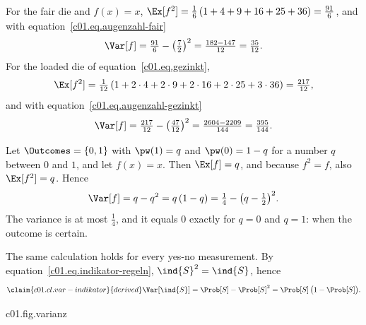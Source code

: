 \begin{example}\label{c01.ex.wuerfel-varianz}
  For the fair die and $f(x) = x$,
  $\Ex[f^2] = \tfrac16\,(1 + 4 + 9 + 16 + 25 + 36) = \tfrac{91}{6}$, and with
  equation~\eqref{c01.eq.augenzahl-fair}
  \begin{equation}\label{c01.eq.varianz-fair}
    \Var[f] = \tfrac{91}{6} - \bigl(\tfrac72\bigr)^2 = \tfrac{182 - 147}{12} = \tfrac{35}{12} .
  \end{equation}
  For the loaded die of equation~\eqref{c01.eq.gezinkt},
  \begin{equation*}
    \Ex[f^2] = \tfrac{1}{12}\,(1 + 2\cdot 4 + 2\cdot 9 + 2\cdot 16 + 2\cdot 25 + 3\cdot 36)
    = \tfrac{217}{12} ,
  \end{equation*}
  and with equation~\eqref{c01.eq.augenzahl-gezinkt}
  \begin{equation}\label{c01.eq.varianz-gezinkt}
    \Var[f] = \tfrac{217}{12} - \bigl(\tfrac{47}{12}\bigr)^2
            = \tfrac{2604 - 2209}{144} = \tfrac{395}{144} .
  \end{equation}
\end{example}

\begin{example}\label{c01.ex.muenze}
  Let $\Outcomes = \{0, 1\}$ with $\pw(1) = q$ and $\pw(0) = 1 - q$ for a number $q$
  between $0$ and $1$, and let $f(x) = x$. Then $\Ex[f] = q$, and because $f^2 = f$,
  also $\Ex[f^2] = q$. Hence
  \begin{equation}\label{c01.eq.zwei-ergebnisse}
    \Var[f] = q - q^2 = q\,(1 - q) = \tfrac14 - \bigl(q - \tfrac12\bigr)^2 .
  \end{equation}
  The variance is at most $\tfrac14$, and it equals $0$ exactly for $q = 0$ and $q = 1$:
  when the outcome is certain.
\end{example}

The same calculation holds for every yes-no measurement. By
equation~\eqref{c01.eq.indikator-regeln}, $\ind{S}^2 = \ind{S}$, hence
\begin{equation}\label{c01.eq.var-indikator}\claim{c01.cl.var-indikator}{derived}
  \Var[\ind{S}] = \Prob[S] - \Prob[S]^2 = \Prob[S]\,\bigl(1 - \Prob[S]\bigr) .
\end{equation}

\begin{tpcfigure}{c01.fig.varianz}

  \caption{(a), (b) Two weights with the same expectation value $\tfrac72$ of the number of
    spots $f(x) = x$ (dashed line) and different variance: the fair die of
    equation~\eqref{c01.eq.varianz-fair} and a weight that lies half on $3$ and half on
    $4$; for the latter $\Ex[f^2] = \tfrac{9 + 16}{2}$ and
    $\Var[f] = \tfrac{25}{2} - \tfrac{49}{4} = \tfrac14$. (c) The variance
    of a yes-no measurement as a function of $q = \Prob[S]$ by
    equation~\eqref{c01.eq.var-indikator}: it vanishes exactly at the two ends, where
    the answer is certain, and is largest at $q = \tfrac12$.}
\end{tpcfigure}

